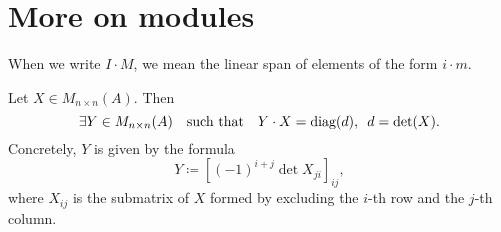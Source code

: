 \section{More on modules}
\begin{note}
  When we write $I \cdot M$, we mean the linear span of elements of the form $i \cdot m$.
\end{note}

\begin{lemma}
  \label{adjugate matrix}
  Let
  $X \in M_{n \times n}(A)$.
  Then
  \[ \exists Y \in M_{n \times n}(A) \quad \text{such that} \quad Y \cdot X = \text{diag}(d), \enspace d = \det(X).\]
  Concretely,
  $Y$ is given by the formula
  \[ Y \coloneqq [ (-1)^{i+j} \det X_{ji} ]_{ij}, \]
  where
  $X_{ij}$ is the submatrix of $X$ formed by excluding the $i$-th row and the $j$-th column.
\end{lemma}

